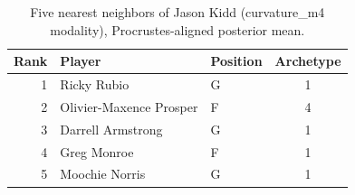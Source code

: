 \begin{table}[htbp]
  \centering\small
  \begin{tabular}{rllc}
    \toprule
    Rank & Player & Position & Archetype \\
    \midrule
    1 & Ricky Rubio & G & 1 \\
    2 & Olivier-Maxence Prosper & F & 4 \\
    3 & Darrell Armstrong & G & 1 \\
    4 & Greg Monroe & F & 1 \\
    5 & Moochie Norris & G & 1 \\
    \bottomrule
  \end{tabular}
  \caption{Five nearest neighbors of Jason Kidd (curvature_m4 modality), Procrustes-aligned posterior mean.}
  \label{tab:Jason_Kidd_neighbors_curvature_m4}
\end{table}

